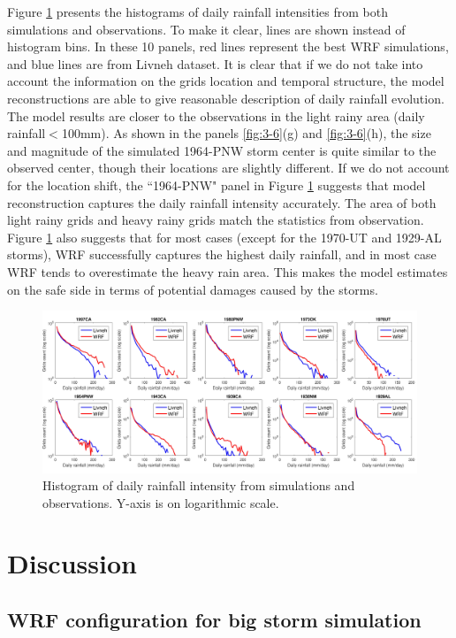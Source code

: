 Figure \ref{fig:3-8} presents the histograms of daily rainfall intensities from both simulations and observations. To make it clear, lines are shown instead of histogram bins. In these 10 panels, red lines represent the best WRF simulations, and blue lines are from Livneh dataset. It is clear that if we do not take into account the information on the grids location and temporal structure, the model reconstructions are able to give reasonable description of daily rainfall evolution. The model results are closer to the observations in the light rainy area (daily rainfall$<$100mm). As shown in the panels \ref{fig:3-6}(g) and \ref{fig:3-6}(h), the size and magnitude of the simulated 1964-PNW storm center is quite similar to the observed center, though their locations are slightly different. If we do not account for the location shift, the ``1964-PNW" panel in Figure \ref{fig:3-8} suggests that model reconstruction captures the daily rainfall intensity accurately. The area of both light rainy grids and heavy rainy grids match the statistics from observation. Figure \ref{fig:3-8} also suggests that for most cases (except for the 1970-UT and 1929-AL storms), WRF successfully captures the highest daily rainfall, and in most case WRF tends to overestimate the heavy rain area. This makes the model estimates on the safe side in terms of potential damages caused by the storms.

\begin{figure}
	\includegraphics[width=\linewidth]{pics/ch3/fig8.jpg}
	\caption{Histogram of daily rainfall intensity from simulations and observations. Y-axis is on logarithmic scale.}
	\label{fig:3-8}
\end{figure}


\section{Discussion}

\subsection{WRF configuration for big storm simulation}

